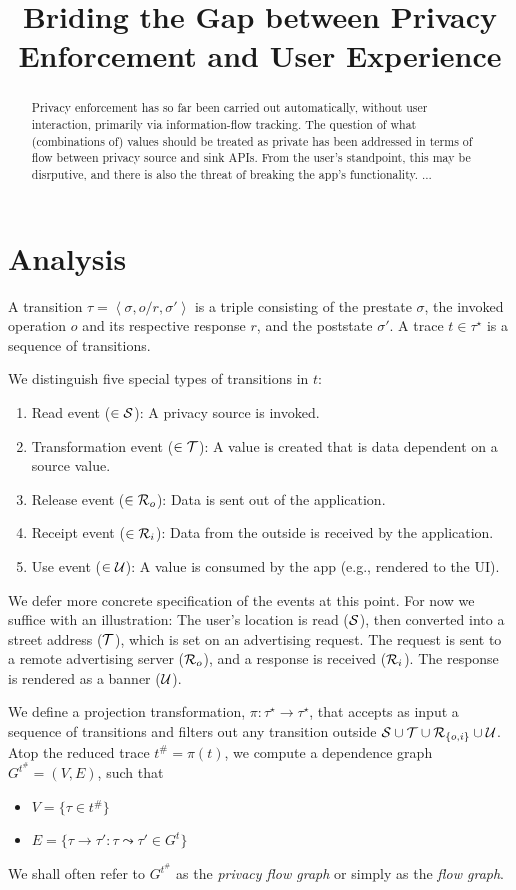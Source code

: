 \documentclass[]{article}
\title{Briding the Gap between Privacy Enforcement and User Experience}
\author{}
\begin{document}
\maketitle

\begin{abstract}
Privacy enforcement has so far been carried out automatically, without user interaction, primarily via information-flow tracking. The question of what (combinations of) values should be treated as private has been addressed in terms of flow between privacy source and sink APIs. From the user's standpoint, this may be disrputive, and there is also the threat of breaking the app's functionality. ...
\end{abstract}

\section{Analysis}

A transition $\tau = \left\langle \sigma,o/r,\sigma'  \right\rangle$ is a triple consisting of the prestate $\sigma$, the invoked operation $o$ and its respective response $r$, and the poststate $\sigma'$. A trace $t \in \tau^{\star}$ is a sequence of transitions.

We distinguish five special types of transitions in $t$:
\begin{enumerate}
	\item Read event ($\in {\cal S}$): A privacy source is invoked.
	\item Transformation event ($\in {\cal T}$): A value is created that is data dependent on a source value.
	\item Release event ($\in {\cal R}_o$): Data is sent out of the application.
	\item Receipt event ($\in {\cal R}_i$): Data from the outside is received by the application.
	\item Use event ($\in {\cal U}$): A value is consumed by the app (e.g., rendered to the UI).
\end{enumerate}
We defer more concrete specification of the events at this point. For now we suffice with an illustration: The user's location is read (${\cal S}$), then converted into a street address (${\cal T}$), which is set on an advertising request. The request is sent to a remote advertising server (${\cal R}_o$), and a response is received (${\cal R}_i$). The response is rendered as a banner (${\cal U}$).

We define a projection transformation, $\pi \colon \tau^{\star} \rightarrow \tau^{\star}$, that accepts as input a sequence of transitions and filters out any transition outside ${\cal S} \cup {\cal T} \cup {\cal R}_{\{ o,i \}} \cup {\cal U}$. Atop the reduced trace $t^{\#} = \pi(t)$, we compute a dependence graph $G^{t^{\#}} = (V,E)$, such that
\begin{itemize}
	\item $V = \{ \tau \in t^{\#} \}$
	\item $E = \{ \tau \rightarrow \tau' \colon \tau \leadsto \tau' \in G^t \}$
\end{itemize}
We shall often refer to $G^{t^{\#}}$ as the \emph{privacy flow graph} or simply as the \emph{flow graph}.
\end{document}
